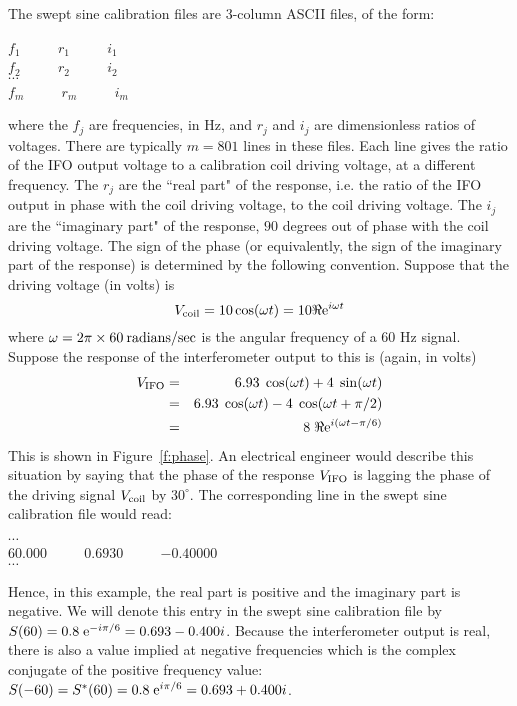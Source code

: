 The swept sine calibration files are 3-column ASCII files, of the form:
\begin{center}
$f_1$ $\qquad$ $r_1$ $\qquad$ $i_1$ \\
$f_2$ $\qquad$ $r_2$ $\qquad$ $i_2$ \\
$\cdots$\\
$f_m$ $\qquad$ $r_m$ $\qquad$ $i_m$
\end{center}
where the $f_j$ are frequencies, in Hz, and $r_j$ and $i_j$ are
dimensionless ratios of voltages.  There are typically $m=801$ lines in
these files.  Each line gives the ratio of the IFO output voltage to a
calibration coil driving voltage, at a different frequency.  The $r_j$
are the ``real part" of the response, i.e. the ratio of the IFO output
in phase with the coil driving voltage, to the coil driving voltage.
The $i_j$ are the ``imaginary part" of the response, $90$ degrees out
of phase with the coil driving voltage.  The sign of the phase (or
equivalently, the sign of the imaginary part of the response) is
determined by the following convention.  Suppose that the driving
voltage (in volts) is
\begin{equation}
\label{e:calibrate1}
V_{\rm coil} = 10 \cos( \omega t) = 10 \Re {\rm e}^{i \omega t}
\end{equation}
where $\omega= 2 \pi \times 60 \> {\rm radians/sec}$ is the angular frequency of
a 60 Hz signal.  Suppose the
response of the interferometer output to this is (again, in volts)
\begin{eqnarray}
\label{e:calibrate2}
V_{\rm IFO} &=& 6.93 \; \cos(\omega t) + 4\; \sin(\omega t)\cr
 &=& 6.93 \; \cos(\omega t) - 4\; \cos(\omega t + \pi/2) \cr
 &=& 8 \; \Re {\rm e}^{i (\omega t - \pi/6)}
\end{eqnarray}
This is shown in Figure~\ref{f:phase}. 
An electrical engineer would describe this
situation by saying that the phase of the response $V_{\rm IFO}$ is lagging the
phase of the driving signal $V_{\rm coil}$ by $30^\circ$.  The corresponding line
in the swept sine calibration file would read:
\begin{center}
$\cdots$\\
$60.000$ $\qquad$ $0.6930$ $\qquad$ $-0.40000$\\
$\cdots$
\end{center}
Hence, in this example, the real part is positive and the imaginary
part is negative.  We will denote this entry in the swept sine
calibration file by $S(60) = 0.8 \; {\rm e}^{ -i\pi/6} = 0.693 - 0.400
i$.  Because the interferometer output is real, there is also a value
implied at negative frequencies which is the complex conjugate of the
positive frequency value:  $S(-60) = S^*(60) = 0.8 \; {\rm e}^{
i\pi/6} = 0.693 + 0.400 i$.

